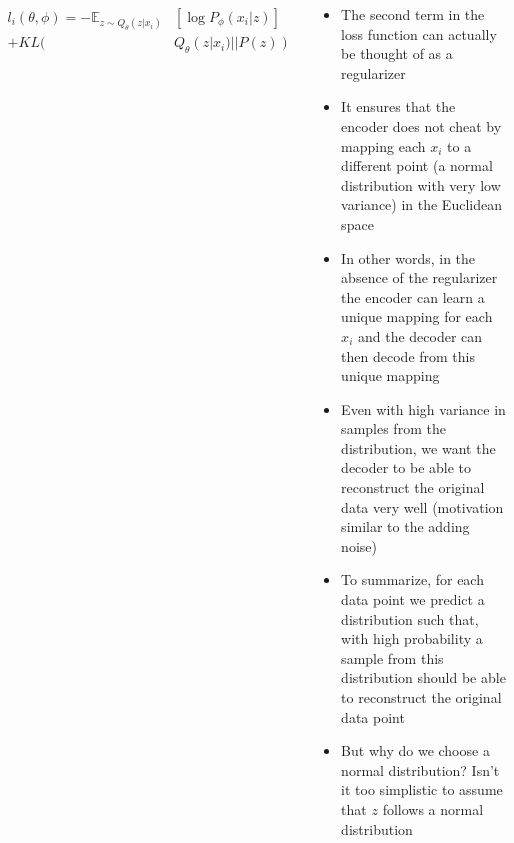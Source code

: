 \begin{frame}
\begin{columns}
	\begin{overlayarea}{\textwidth}{\textheight}
	    
		\vspace{-0.7cm}
		\begin{align*}
		l_i(\theta,\phi)=-\mathbb{E}_{z \sim Q_{\theta}(z|x_i)}& [\log P_{\phi}(x_i|z)] \\
		+ KL(&Q_{\theta}(z|x_i)||P(z))
		\end{align*}
	\end{overlayarea}
	\begin{overlayarea}{\textwidth}{\textheight}
		\begin{itemize}\justifying \footnotesize
			\item<1-> The second term in the loss function can actually be thought of as a regularizer
			\item<2-> It ensures that the encoder does not cheat by mapping each $x_i$ to a different point (a normal distribution with very low variance) in the Euclidean space 
			\item<3-> In other words, in the absence of the regularizer the encoder can learn a unique mapping for each $x_i$ and the decoder can then decode from this unique mapping
			\item<4-> Even with high variance in samples from the distribution, we want the decoder to be able to reconstruct the original data very well (motivation similar to the adding noise)
			\item<5-> To summarize, for each data point we predict a distribution such that, with high probability a sample from this distribution should be able to reconstruct the original data point
			\item<6-> But why do we choose a normal distribution? Isn't it too simplistic to assume that $z$ follows a normal distribution
		\end{itemize}
	\end{overlayarea}
\end{columns}
\end{frame}

